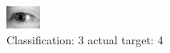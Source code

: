 \begin{figure}[h!]
\begin{center}
\includegraphics[width=0.60\columnwidth]{figures/ID3267_class_3_target_4.png}
\end{center}
\caption{ Classification: 3 actual target: 4}
\label{fig:ID3267_class_3_target_4}
\end{figure}
